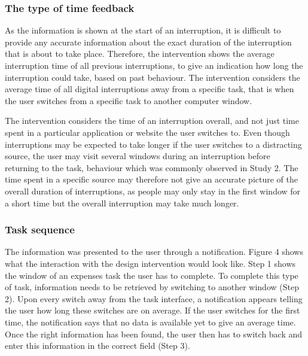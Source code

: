 \subsubsection{The type of time feedback}
As the information is shown at the start of an interruption, it is difficult to provide any accurate information about the exact duration of the interruption that is about to take place. Therefore, the intervention shows the average interruption time of all previous interruptions, to give an indication how long the interruption could take, based on past behaviour. The intervention considers the average time of all digital interruptions away from a specific task, that is when the user switches from a specific task to another computer window. 

The intervention considers the time of an interruption overall, and not just time spent in a particular application or website the user switches to. Even though interruptions may be expected to take longer if the user switches to a distracting source, the user may visit several windows during an interruption before returning to the task, behaviour which was commonly observed in Study 2. The time spent in a specific source may therefore not give an accurate picture of the overall duration of interruptions, as people may only stay in the first window for a short time but the overall interruption may take much longer. 

\subsubsection{Task sequence}
The information was presented to the user through a notification. Figure 4 shows what the interaction with the design intervention would look like. Step 1 shows the window of an expenses task the user has to complete. To complete this type of task, information needs to be retrieved by switching to another window (Step 2). Upon every switch away from the task interface, a notification appears telling the user how long these switches are on average. If the user switches for the first time, the notification says that no data is available yet to give an average time. Once the right information has been found, the user then has to switch back and enter this information in the correct field (Step 3). 

